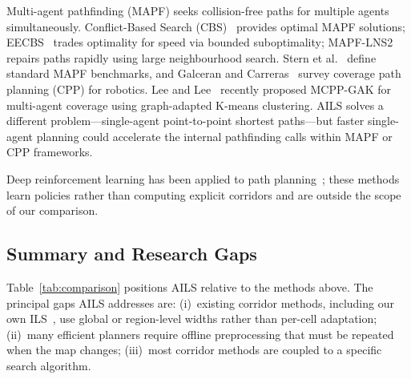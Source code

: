 \documentclass[journal]{IEEEtran}
\begin{document}
Multi-agent pathfinding (MAPF) seeks collision-free paths for multiple agents simultaneously.
Conflict-Based Search (CBS)~\cite{sharon2015conflict} provides optimal MAPF solutions; EECBS~\cite{li2021eecbs} trades optimality for speed via bounded suboptimality; MAPF-LNS2~\cite{li2022mapflns2} repairs paths rapidly using large neighbourhood search.
Stern et al.~\cite{stern2019mapf} define standard MAPF benchmarks, and Galceran and Carreras~\cite{galceran2013survey} survey coverage path planning (CPP) for robotics.
Lee and Lee~\cite{lee2025mcpp} recently proposed MCPP-GAK for multi-agent coverage using graph-adapted K-means clustering.
AILS solves a different problem---single-agent point-to-point shortest paths---but faster single-agent planning could accelerate the internal pathfinding calls within MAPF or CPP frameworks.

Deep reinforcement learning has been applied to path planning~\cite{zhang2023deep,yu2024drl}; these methods learn policies rather than computing explicit corridors and are outside the scope of our comparison.

\subsection{Summary and Research Gaps}

Table~\ref{tab:comparison} positions AILS relative to the methods above.
The principal gaps AILS addresses are:
(i)~existing corridor methods, including our own ILS~\cite{elshahed2025ils}, use global or region-level widths rather than per-cell adaptation;
(ii)~many efficient planners require offline preprocessing that must be repeated when the map changes;
(iii)~most corridor methods are coupled to a specific search algorithm.
\end{document}
